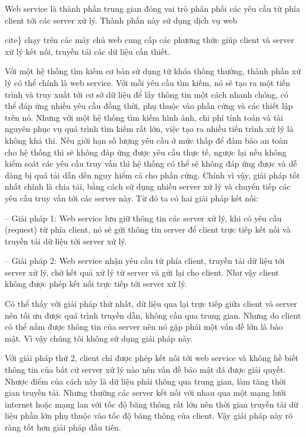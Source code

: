 Web service là thành phần trung gian đóng vai trò phân phối các yêu cầu từ phía client tới các server xử lý. Thành phần này sử dụng dịch vụ web {cite\} chạy trên các máy chủ web cung cấp các phương thức giúp client và server xử lý kết nối, truyền tải các dữ liệu cần thiết.

Với một hệ thống tìm kiếm cơ bản sử dụng từ khóa thông thường, thành phần xử lý có thể chính là web service. Với mỗi yêu cầu tìm kiếm, nó sẽ tạo ra một tiến trình và truy xuất tới cơ sở dữ liệu để lấy thông tin một cách nhanh chóng, có thể đáp ứng nhiều yêu cầu đồng thời, phụ thuộc vào phần cứng và các thiết lập trên nó. Nhưng với một hệ thống tìm kiếm hình ảnh, chi phí tính toán và tài nguyên phục vụ quá trình tìm kiếm rất lớn, việc tạo ra nhiều tiến trình xử lý là không khả thi. Nếu giới hạn số lượng yêu cầu ở mức thấp để đảm bảo an toàn cho hệ thống thì sẽ không đáp ứng được yêu cầu thực tế, ngược lại nếu không kiểm soát các yêu cầu truy vấn thì hệ thống có thể sẽ không đáp ứng được và dễ dàng bị quá tải dẫn dến nguy hiểm cả cho phần cứng. Chính vì vậy, giải pháp tốt nhất chính là chia tải, bằng cách sử dụng nhiều server xử lý và chuyển tiếp các yêu cầu truy vấn tới các server này. Từ đó ta có hai giải pháp kết nối:

-- Giải pháp 1: Web service lưu giữ thông tin các server xử lý, khi có yêu cầu (request) từ phía client, nó sẽ gửi thông tin server để client trực tiếp kết nối và truyền tải dữ liệu tới server xử lý.

-- Giải pháp 2: Web service nhận yêu cầu từ phía client, truyền tải dữ liệu tới server xử lý, chờ kết quả xử lý từ server và gửi lại cho client. Như vậy client không được phép kết nối trực tiếp tới server xử lý.

Có thể thấy với giải pháp thứ nhất, dữ liệu qua lại trực tiếp giữa client và server nên tối ưu được quá trình truyền dẫn, không cần qua trung gian. Nhưng do client có thể nắm được thông tin của server nên nó gặp phải một vấn đề lớn là bảo mật. Vì vậy chúng tôi không sử dụng giải pháp này.

Với giải pháp thứ 2, client chỉ được phép kết nối tới web service và không hề biết thông tin của bất cứ server xử lý nào nên vấn đề bảo mật đã được giải quyết. Nhược điểm của cách này là dữ liệu phải thông qua trung gian, làm tăng thời gian truyền tải. Nhưng thường các server kết nối với nhau qua một mạng lưới internet hoặc mạng lan với tốc độ băng thông rất lớn nên thời gian truyền tải dữ liệu phần lớn phụ thuộc vào tốc độ băng thông của client. Vậy giải pháp này rõ ràng tốt hơn giải pháp đầu tiên.

}
